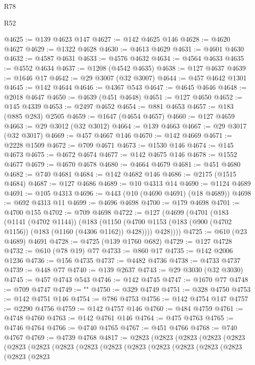 \begin{lexlean}{R78}
\begin{lexlean}{R52}
\begin{coremodule}
{{{{{{{{{{{{{{{{{{{{{{{{{{{{{{{{{{{{{{{{{{{{{{{{{{{{{{{{{{{{{{{{{{{{{{{{{{{{{{{{{{{{{{{{{{{{{{{{{{{{{{{{{{{{{{{{{{{{{{{{{{{{{{{{{{{{{{{{{{{{{{{{{{{{{{{{{{{{{{{{{{{{{{{{{{{{{{{{{{{{{{{{{{{{{{{{{{{{{{@4625 := @139 @4623 @147
@4627 := @142 @4625 @146
@4628 := @4620 @4627
@4629 := @1322 @4628
@4630 := @4613 @4629
@4631 := @4601 @4630
@4632 := @4587 @4631
@4633 := @4576 @4632
@4634 := @4564 @4633
@4635 := @4552 @4634
@4637 := @1208 (@4542 @4635)
@4638 := @127 @4637
@4639 := @1646 @17
@4642 := @29 @3007 (@32 @3007)
@4644 := @457 @4642 @1301
@4645 := @142 @4644
@4646 := @4367 @543
@4647 := @4645 @4646
@4648 := @2018 @4647
@4650 := @4639 (@451 @4648)
@4651 := @127 @4650
@4652 := @145 @4339
@4653 := @2497 @4652
@4654 := @881 @4653
@4657 := @183 (@885 @283) @2505
@4659 := @1647 (@4654 @4657)
@4660 := @127 @4659
@4663 := @29 @3012 (@32 @3012)
@4664 := @139 @4663
@4667 := @29 @3017 (@32 @3017)
@4669 := @457 @4667 @146
@4670 := @142 @4669
@4671 := @2228 @1509
@4672 := @709 @4671
@4673 := @1530 @146
@4674 := @145 @4673
@4675 := @4672 @4674
@4677 := @142 @4675 @146
@4678 := @1552 @4677
@4679 := @4670 @4678
@4680 := @4664 @4679
@4681 := @451 @4680
@4682 := @740 @4681
@4684 := @142 @4682 @146
@4686 := @2175 (@1515 @4684)
@4687 := @127 @4686
@4689 := @10 @4313 @14
@4690 := @1124 @4689
@4691 := @105 @4313
@4696 := @443 (@10 (@4690 @4691) (@18 @4689))
@4698 := @692 @4313 @11
@4699 := @4696 @4698
@4700 := @179 @4698
@4701 := @4700 @155
@4702 := @709 @4698
@4722 := @127
    (@4699
      (@4701
        (@183
          (@1141 (@4702 @1144))
          (@183
            (@1150 (@4700 @1153 (@183 (@900 (@4702 @1156)) (@183 (@1160 (@4306 @1162)) @428))))
            @428))))
@4725 := @610 (@23 @4689) @4691
@4728 := @4725 (@139 @1760 @682)
@4729 := @127 @4728
@4732 := @610 (@78 @19) @77
@4733 := @860 @17
@4735 := @142 @2006 @1236
@4736 := @156 @4735
@4737 := @4482 @4736
@4738 := @4733 @4737
@4739 := @448 @77
@4740 := @139 @2637
@4743 := @29 @3030 (@32 @3030)
@4745 := @457 @4743 @543
@4746 := @142 @4745
@4747 := @1670 @77
@4748 := @709 @4747
@4749 := "\n"
@4750 := @329 @4749
@4751 := @328 @4750
@4753 := @142 @4751 @146
@4754 := @786 @4753
@4756 := @142 @4754 @147
@4757 := @2290 @4756
@4759 := @142 @4757 @146
@4760 := @484 @4759
@4761 := @4748 @4760
@4763 := @142 @4761 @146
@4764 := @475 @4763
@4765 := @4746 @4764
@4766 := @4740 @4765
@4767 := @451 @4766
@4768 := @740 @4767
@4769 := @4739 @4768
@4817 := @2823
    (@2823
      (@2823
        (@2823
          (@2823
            (@2823
              (@2823
                (@2823
                  (@2823
                    (@2823
                      (@2823
                        (@2823
                          (@2823
                            (@2823
                              (@2823
                                (@2823
                                  (@2823
}}}}}}}}}}}}}}}}}}}}}}}}}}}}}}}}}}}}}}}}}}}}}}}}}}}}}}}}}}}}}}}}}}}}}}}}}}}}}}}}}}}}}}}}}}}}}}}}}}}}}}}}}}}}}}}}}}}}}}}}}}}}}}}}}}}}}}}}}}}}}}}}}}}}}}}}}}}}}}}}}}}}}}}}}}}}}}}}}}}}}}}}}}}}}}}}}}}}}}
\end{coremodule}
\end{lexlean}
\end{lexlean}
